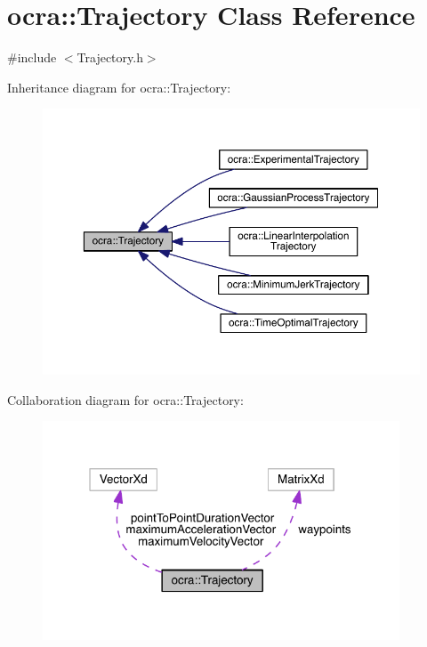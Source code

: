 \hypertarget{classocra_1_1Trajectory}{}\section{ocra\+:\+:Trajectory Class Reference}
\label{classocra_1_1Trajectory}


{\ttfamily \#include $<$Trajectory.\+h$>$}



Inheritance diagram for ocra\+:\+:Trajectory\+:\nopagebreak
\begin{figure}[H]
\begin{center}
\leavevmode
\includegraphics[width=350pt]{d1/dd5/classocra_1_1Trajectory__inherit__graph}
\end{center}
\end{figure}


Collaboration diagram for ocra\+:\+:Trajectory\+:\nopagebreak
\begin{figure}[H]
\begin{center}
\leavevmode
\includegraphics[width=301pt]{dc/dda/classocra_1_1Trajectory__coll__graph}
\end{center}
\end{figure}
